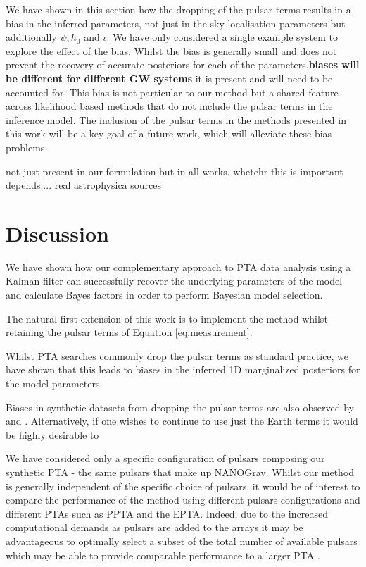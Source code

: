 \documentclass[fleqn,usenatbib,useAMS]{mnras}
\begin{document}
We have shown in this section how the dropping of the pulsar terms results in a bias in the inferred parameters, not just in the sky localisation parameters  \citep[e.g.][]{Zhupulsarterms,Chen2022} but additionally $\psi, h_0$ and $\iota$. We have only considered a single example system to explore the effect of the bias. Whilst the bias is generally small and does not prevent the recovery of accurate posteriors for each of the parameters,\textbf{biases will be different for different GW systems}  it is present and will need to be accounted for. This bias is not particular to our method but a shared feature across likelihood based methods that do not include the pulsar terms in the inference model. The inclusion of the pulsar terms in the methods presented in this work will be a key goal of a future work, which will alleviate these bias problems. 



not just present in our formulation but in all works. whetehr this is important depends.... real astrophysica sources









\section{Discussion}
We have shown how our complementary approach to PTA data analysis using a Kalman filter can successfully recover the underlying parameters of the model and calculate Bayes factors in order to perform Bayesian model selection. 



The natural first extension of this work is to implement the method whilst retaining the pulsar terms of Equation \ref{eq:measurement}. 



Whilst PTA searches commonly drop the pulsar terms as standard practice, we have shown that this leads to biases in the inferred 1D marginalized posteriors for the model parameters. 

Biases in synthetic datasets from dropping the pulsar terms are also observed by \cite{Zhupulsarterms} and \cite{Chen2022}. Alternatively, if one wishes to continue to use just the Earth terms it would be highly desirable to 


We have considered only a specific configuration of pulsars composing our synthetic PTA - the same pulsars that make up NANOGrav. Whilst our method is generally independent of the specific choice of pulsars, it would be of interest to compare the performance of the method using different pulsars configurations and different PTAs such as PPTA and the EPTA. Indeed, due to the increased computational demands as pulsars are added to the arrays it may be advantageous to optimally select a subset of the total number of available pulsars which may be able to provide comparable performance to a larger PTA  \citep{2023MNRAS.518.1802S}. 
\end{document}

